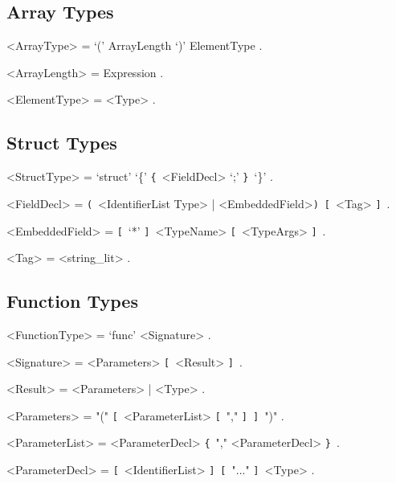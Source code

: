 \documentclass{article}
\def\lrep{\synshortsoff\texttt{\{}\synshorts~}
\def\rrep{\synshortsoff\texttt{\}}\synshorts~}
\def\lopt{\synshortsoff\texttt{[}\synshorts~}
\def\ropt{\synshortsoff\texttt{]}\synshorts~}
\def\lgrp{\synshortsoff\texttt{(}\synshorts~}
\def\rgrp{\synshortsoff\texttt{)}\synshorts~}
\begin{document}
	

\subsection*{Array Types}
\begin{grammar}
	<ArrayType> = `(' ArrayLength `)' ElementType .

	<ArrayLength> = Expression .
 
	<ElementType> = <Type> . 
\end{grammar}



\subsection*{Struct Types} 
\begin{grammar} 
	<StructType> = `struct' `\{'  \lrep <FieldDecl> `;'  \rrep `\}' .

	<FieldDecl> = \lgrp<IdentifierList Type> | <EmbeddedField>\rgrp \lopt <Tag> \ropt . 

	<EmbeddedField> = \lopt `*' \ropt <TypeName> \lopt <TypeArgs> \ropt .

	<Tag> = <string_lit> .  
\end{grammar}



\subsection*{Function Types} 
\begin{grammar} 
	<FunctionType> = `func' <Signature> .

	<Signature> = <Parameters> \lopt <Result> \ropt .

	<Result> = <Parameters> | <Type> .

	<Parameters> = "(" \lopt <ParameterList> \lopt "," \ropt \ropt ")" .

	<ParameterList> = <ParameterDecl> \lrep "," <ParameterDecl> \rrep .

	<ParameterDecl> = \lopt <IdentifierList> \ropt \lopt "..." \ropt <Type> .
\end{grammar}
\end{document}
